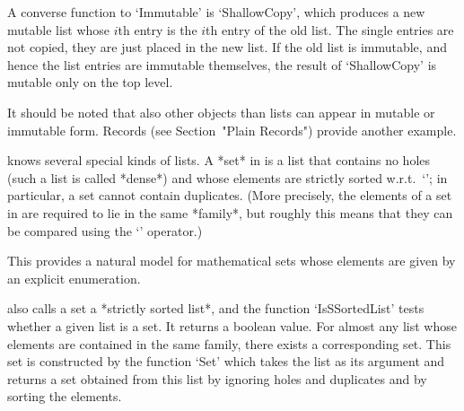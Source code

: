 A converse function to `Immutable' is `ShallowCopy', which produces a
new mutable list whose $i$th entry is the $i$th entry of the old
list. The single entries are not copied, they are just placed in the
new list.  If the old list is immutable, and hence the list entries
are immutable themselves, the result of `ShallowCopy' is mutable only
on the top level.

It should be noted that also other objects than lists can appear in
mutable or immutable form.
Records (see Section~"Plain Records") provide another example.

%


%
{\GAP} knows several special kinds of lists.  A *set* in {\GAP} is a
list that contains no holes (such a list is called *dense*) and whose
elements are strictly sorted w.r.t.~`\<'; in particular, a set cannot
contain duplicates.  (More precisely, the elements of a set in {\GAP}
are required to lie in the same *family*, but roughly this means that
they can be compared using the `\<' operator.)

This provides a natural model for mathematical sets whose elements are
given by an explicit enumeration.

{\GAP} also calls a set a *strictly sorted list*, and the function
`IsSSortedList' tests whether a given list is a set.  It returns a
boolean value.  For almost any list whose elements are contained in
the same family, there exists a corresponding set.  This set is
constructed by the function `Set' which takes the list as its argument
and returns a set obtained from this list by ignoring holes and
duplicates and by sorting the elements.


